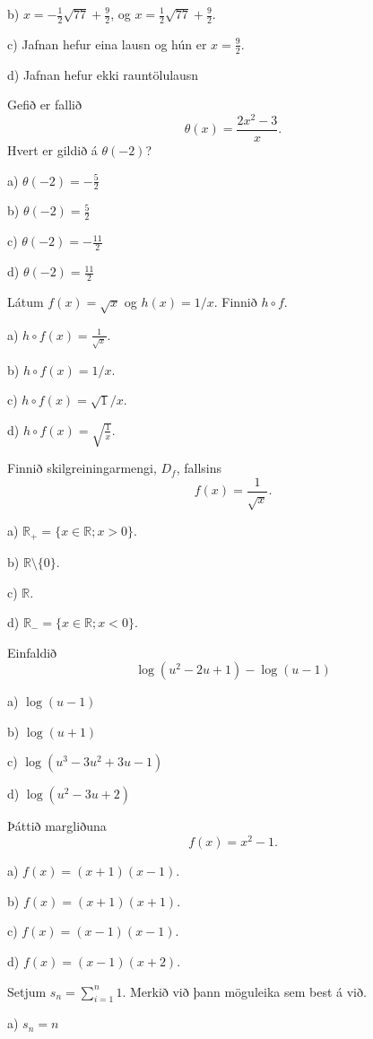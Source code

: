 b) $x = - \frac{1}{2} \sqrt{77} + \frac{9}{2}$, og $x=\frac{1}{2} \sqrt{77} + \frac{9}{2}$. 

c) Jafnan hefur eina lausn og hún er $x=\frac{9}{2}$.

d) Jafnan hefur ekki rauntölulausn


\item Gefið er fallið $$\displaystyle\theta(x)=\frac{2x^2-3}{x}.$$ Hvert er gildið á $\theta(-2)$?

a) $\theta(-2)=-\frac{5}{2}$

b) $\theta(-2)=\frac{5}{2}$

c) $\theta(-2)=-\frac{11}{2}$

d) $\theta(-2)=\frac{11}{2}$

\item Látum $f(x)=\sqrt x$ og $h(x)=1/x$. Finnið $h\circ f$.

a) $h\circ f(x) = \frac{1}{\sqrt x}$.

b) $h \circ f(x) = 1/x$.

c) $h \circ f(x) = \sqrt{1}/x$.

d) $h \circ f(x) = \sqrt{\frac 1x}$.

\item Finnið skilgreiningarmengi, $D_f$, fallsins $$f(x) = \frac{1}{\sqrt x}.$$

a) $\mathbb{R}_+ = \{ x \in \mathbb{R} ; x>0\}$.

b) $\mathbb{R} \setminus \{0\}$.

c) $\mathbb{R}$.

d) $\mathbb{R}_- = \{ x \in \mathbb{R} ; x<0\}$.

\item Einfaldið
$$\log(u^2-2u+1)-\log(u-1)$$

a) $\log(u-1)$

b) $\log(u+1)$

c) $\log(u^3-3u^2+3u-1)$

d) $\log(u^2-3u+2)$


\item Þáttið margliðuna $$f(x) = x^2 -1.$$ 

a) $f(x) = (x+1)(x-1)$.

b) $f(x) = (x+1)(x+1)$.

c) $f(x) = (x-1)(x-1)$.

d) $f(x) = (x-1)(x+2)$.

\item Setjum $s_n = \sum_{i=1}^n 1$. Merkið við þann möguleika sem best á við.

a) $s_n = n$

